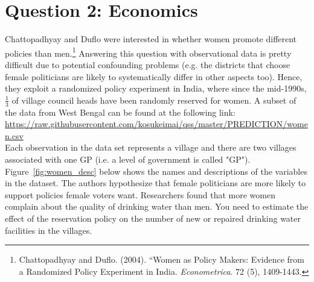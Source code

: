 \documentclass[12pt,letterpaper]{article}
\begin{document}
\section*{Question 2: Economics}
Chattopadhyay and Duflo were interested in whether women promote different policies than men.\footnote{Chattopadhyay and Duflo. (2004). ``Women as Policy Makers: Evidence from a Randomized Policy Experiment in India. \textit{Econometrica}. 72 (5), 1409-1443.} Answering this question with observational data is pretty difficult due to potential confounding problems (e.g. the districts that choose female politicians are likely to systematically differ in other aspects too). Hence, they exploit a randomized policy experiment in India, where since the mid-1990s, $\frac{1}{3}$ of village council heads have been randomly reserved for women. A subset of the data from West Bengal can be found at the following link: \url{https://raw.githubusercontent.com/kosukeimai/qss/master/PREDICTION/women.csv}\\

\noindent Each observation in the data set represents a village and there are two villages associated with one GP (i.e. a level of government is called "GP"). Figure~\ref{fig:women_desc} below shows the names and descriptions of the variables in the dataset. The authors hypothesize that female politicians are more likely to support policies female voters want. Researchers found that more women complain about the quality of drinking water than men. You need to estimate the effect of the reservation policy on the number of new or repaired drinking water facilities in the villages.
\vspace{.5cm}
	
\end{document}

